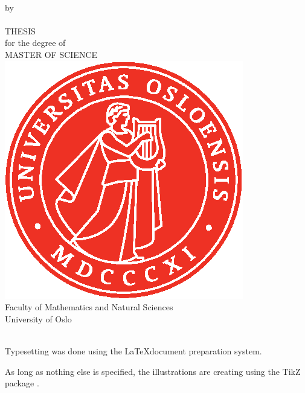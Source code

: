 \thispagestyle{empty}
\begin{center} \vspace{1cm}
    \textbf{\Large{\mtitle}}\\ \vspace{0.5cm}
    \small{by}\\ \vspace{0.5cm}
    \large{\mauthor}\\ \vspace{4.4cm}
    \large{THESIS}\\ \vspace{0.3cm}
    \small{for the degree of}\\ \vspace{0.3cm}
    \large{MASTER OF SCIENCE}\\ \vspace{0.7cm}
    \includegraphics[scale=1.0]{Images/UiO_Segl_pms485.eps} \\ \vspace{0.5cm}
    \large{Faculty of Mathematics and Natural Sciences \\ University of Oslo} \\ \vspace{0.5cm}
    \small{\mdate}\\ \vfill
\end{center}
\newpage
\vspace*{\fill}
Typesetting was done using the \LaTeX  document preparation system.

As long as nothing else is specified, the illustrations are creating using the TikZ package \cite{tantau_graph_2013}.

